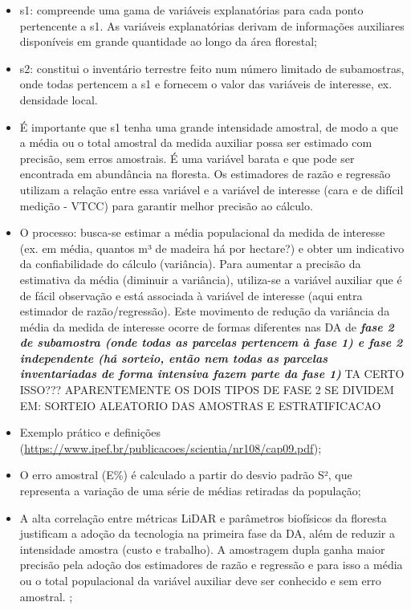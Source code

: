 \documentclass[
]{article}
\begin{document}
\begin{itemize}
\item
  s1: compreende uma gama de variáveis explanatórias para cada ponto
  pertencente a s1. As variáveis explanatórias derivam de informações
  auxiliares disponíveis em grande quantidade ao longo da área
  florestal;\\
\item
  s2: constitui o inventário terrestre feito num número limitado de
  subamostras, onde todas pertencem a s1 e fornecem o valor das
  variáveis de interesse, ex. densidade local.
\item
  É importante que s1 tenha uma grande intensidade amostral, de modo a
  que a média ou o total amostral da medida auxiliar possa ser estimado
  com precisão, sem erros amostrais. É uma variável barata e que pode
  ser encontrada em abundância na floresta. Os estimadores de razão e
  regressão utilizam a relação entre essa variável e a variável de
  interesse (cara e de difícil medição - VTCC) para garantir melhor
  precisão ao cálculo.
\item
  O processo: busca-se estimar a média populacional da medida de
  interesse (ex. em média, quantos m³ de madeira há por hectare?) e
  obter um indicativo da confiabilidade do cálculo (variância). Para
  aumentar a precisão da estimativa da média (diminuir a variância),
  utiliza-se a variável auxiliar que é de fácil observação e está
  associada à variável de interesse (aqui entra estimador de
  razão/regressão). Este movimento de redução da variância da média da
  medida de interesse ocorre de formas diferentes nas DA de
  \textbf{\emph{fase 2 de subamostra (onde todas as parcelas pertencem à
  fase 1) e fase 2 independente (há sorteio, então nem todas as parcelas
  inventariadas de forma intensiva fazem parte da fase 1)}} TA CERTO
  ISSO??? APARENTEMENTE OS DOIS TIPOS DE FASE 2 SE DIVIDEM EM: SORTEIO
  ALEATORIO DAS AMOSTRAS E ESTRATIFICACAO
\item
  Exemplo prático e definições
  (\url{https://www.ipef.br/publicacoes/scientia/nr108/cap09.pdf});
\item
  O erro amostral (E\%) é calculado a partir do desvio padrão S², que
  representa a variação de uma série de médias retiradas da população;
\item
  A alta correlação entre métricas LiDAR e parâmetros biofísicos da
  floresta justificam a adoção da tecnologia na primeira fase da DA,
  além de reduzir a intensidade amostra (custo e trabalho). A amostragem
  dupla ganha maior precisão pela adoção dos estimadores de razão e
  regressão e para isso a média ou o total populacional da variável
  auxiliar deve ser conhecido e sem erro amostral. ;
\end{itemize}
\end{document}
